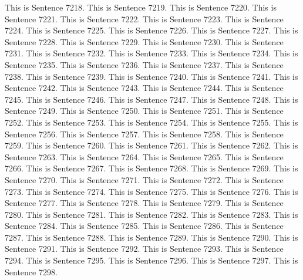 \documentclass{article}
\begin{document}
This is Sentence 7218.
This is Sentence 7219.
This is Sentence 7220.
This is Sentence 7221.
This is Sentence 7222.
This is Sentence 7223.
This is Sentence 7224.
This is Sentence 7225.
This is Sentence 7226.
This is Sentence 7227.
This is Sentence 7228.
This is Sentence 7229.
This is Sentence 7230.
This is Sentence 7231.
This is Sentence 7232.
This is Sentence 7233.
This is Sentence 7234.
This is Sentence 7235.
This is Sentence 7236.
This is Sentence 7237.
This is Sentence 7238.
This is Sentence 7239.
This is Sentence 7240.
This is Sentence 7241.
This is Sentence 7242.
This is Sentence 7243.
This is Sentence 7244.
This is Sentence 7245.
This is Sentence 7246.
This is Sentence 7247.
This is Sentence 7248.
This is Sentence 7249.
This is Sentence 7250.
This is Sentence 7251.
This is Sentence 7252.
This is Sentence 7253.
This is Sentence 7254.
This is Sentence 7255.
This is Sentence 7256.
This is Sentence 7257.
This is Sentence 7258.
This is Sentence 7259.
This is Sentence 7260.
This is Sentence 7261.
This is Sentence 7262.
This is Sentence 7263.
This is Sentence 7264.
This is Sentence 7265.
This is Sentence 7266.
This is Sentence 7267.
This is Sentence 7268.
This is Sentence 7269.
This is Sentence 7270.
This is Sentence 7271.
This is Sentence 7272.
This is Sentence 7273.
This is Sentence 7274.
This is Sentence 7275.
This is Sentence 7276.
This is Sentence 7277.
This is Sentence 7278.
This is Sentence 7279.
This is Sentence 7280.
This is Sentence 7281.
This is Sentence 7282.
This is Sentence 7283.
This is Sentence 7284.
This is Sentence 7285.
This is Sentence 7286.
This is Sentence 7287.
This is Sentence 7288.
This is Sentence 7289.
This is Sentence 7290.
This is Sentence 7291.
This is Sentence 7292.
This is Sentence 7293.
This is Sentence 7294.
This is Sentence 7295.
This is Sentence 7296.
This is Sentence 7297.
This is Sentence 7298.
\end{document}

